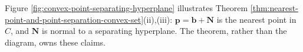 Figure \ref{fig:convex-point-separating-hyperplane} illustrates Theorem \ref{thm:nearest-point-and-point-separation-convex-set}(ii),(iii): $\mathbf{p}=\mathbf{b}+\mathbf{N}$ is the nearest point in $C$, and $\mathbf{N}$ is normal to a separating hyperplane. The theorem, rather than the diagram, owns these claims.

\begin{illustrationfigure}[H]
  \centering
  
  \caption{For $\mathbf{b}\notin C$, the labeled point $\mathbf{p}=\mathbf{b}+\mathbf{N}\in C$ is nearest to $\mathbf{b}$, the arrow $\mathbf{N}$ is the displacement from $\mathbf{b}$ to $\mathbf{p}$, and the labeled hyperplane lies strictly between $\mathbf{b}$ and the closed convex set $C$.}
  \label{fig:convex-point-separating-hyperplane}
\end{illustrationfigure}

